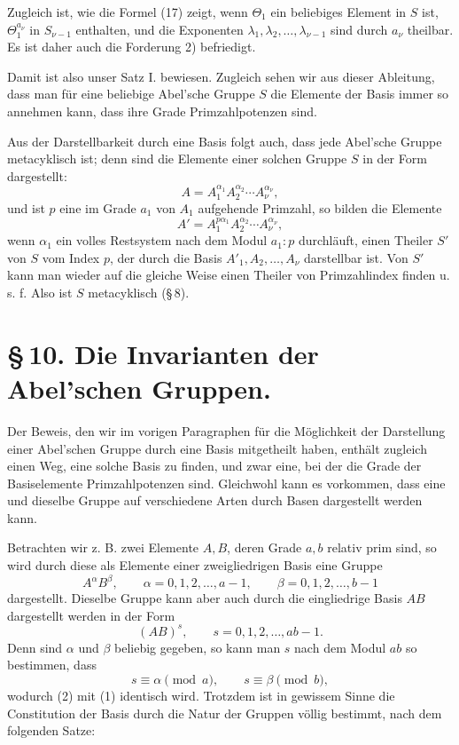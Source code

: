\documentclass[11pt]{article}
\begin{document}
Zugleich ist, wie die Formel (17) zeigt, wenn $\Theta_1$ ein beliebiges Element in $S$ ist, $\Theta_1^{a_\nu}$ in $S_{\nu-1}$ enthalten, und die Exponenten $\lambda_1,\lambda_2,\ldots,\lambda_{\nu-1}$ sind durch $a_\nu$ theilbar. Es ist daher auch die Forderung 2) befriedigt.

Damit ist also unser Satz I. bewiesen. Zugleich sehen wir aus dieser Ableitung, dass man für eine beliebige Abel'sche Gruppe $S$ die Elemente der Basis immer so annehmen kann, dass ihre Grade Primzahlpotenzen sind.

Aus der Darstellbarkeit durch eine Basis folgt auch, dass jede Abel'sche Gruppe metacyklisch ist; denn sind die Elemente einer solchen Gruppe $S$ in der Form dargestellt:
\[
A=A_1^{\alpha_1}A_2^{\alpha_2}\cdots A_\nu^{\alpha_\nu},
\]
und ist $p$ eine im Grade $a_1$ von $A_1$ aufgehende Primzahl, so bilden die Elemente
\[
A'=A_1^{p\alpha_1}A_2^{\alpha_2}\cdots A_\nu^{\alpha_\nu},
\]
wenn $\alpha_1$ ein volles Restsystem nach dem Modul $a_1:p$ durchläuft, einen Theiler $S'$ von $S$ vom Index $p$, der durch die Basis $A'_1,A_2,\ldots,A_\nu$ darstellbar ist. Von $S'$ kann man wieder auf die gleiche Weise einen Theiler von Primzahlindex finden u. s. f. Also ist $S$ metacyklisch (\S\,8).

\section*{\S\,10. Die Invarianten der Abel'schen Gruppen.}

Der Beweis, den wir im vorigen Paragraphen für die Möglichkeit der Darstellung einer Abel'schen Gruppe durch eine Basis mitgetheilt haben, enthält zugleich einen Weg, eine solche Basis zu finden, und zwar eine, bei der die Grade der Basiselemente Primzahlpotenzen sind. Gleichwohl kann es vorkommen, dass eine und dieselbe Gruppe auf verschiedene Arten durch Basen dargestellt werden kann.

Betrachten wir z. B. zwei Elemente $A,B$, deren Grade $a,b$ relativ prim sind, so wird durch diese als Elemente einer zweigliedrigen Basis eine Gruppe
\begin{equation}
A^\alpha B^\beta,
\qquad
\alpha=0,1,2,\ldots,a-1,
\qquad
\beta=0,1,2,\ldots,b-1
\tag{1}
\end{equation}
dargestellt. Dieselbe Gruppe kann aber auch durch die eingliedrige Basis $AB$ dargestellt werden in der Form
\begin{equation}
(AB)^s,
\qquad
s=0,1,2,\ldots,ab-1.
\tag{2}
\end{equation}
Denn sind $\alpha$ und $\beta$ beliebig gegeben, so kann man $s$ nach dem Modul $ab$ so bestimmen, dass
\[
s\equiv\alpha \pmod a,
\qquad
s\equiv\beta \pmod b,
\]
wodurch (2) mit (1) identisch wird. Trotzdem ist in gewissem Sinne die Constitution der Basis durch die Natur der Gruppen völlig bestimmt, nach dem folgenden Satze:
\end{document}
